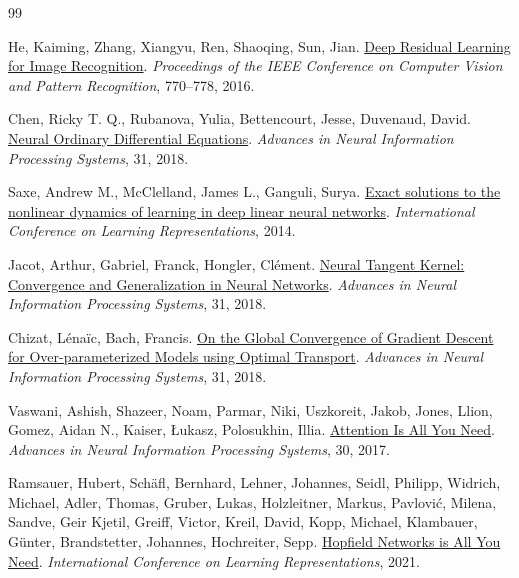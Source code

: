 \documentclass[11pt]{article}
\begin{document}
\begin{thebibliography}{99}

He, Kaiming, Zhang, Xiangyu, Ren, Shaoqing, Sun, Jian.
\newblock \href{https://doi.org/10.1109/CVPR.2016.90}{Deep Residual Learning for Image Recognition}.
\newblock \emph{Proceedings of the IEEE Conference on Computer Vision and Pattern Recognition}, 770--778, 2016.

Chen, Ricky T. Q., Rubanova, Yulia, Bettencourt, Jesse, Duvenaud, David.
\newblock \href{https://arxiv.org/abs/1806.07366}{Neural Ordinary Differential Equations}.
\newblock \emph{Advances in Neural Information Processing Systems}, 31, 2018.

Saxe, Andrew M., McClelland, James L., Ganguli, Surya.
\newblock \href{https://arxiv.org/abs/1312.6120}{Exact solutions to the nonlinear dynamics of learning in deep linear neural networks}.
\newblock \emph{International Conference on Learning Representations}, 2014.

Jacot, Arthur, Gabriel, Franck, Hongler, Cl{\'e}ment.
\newblock \href{https://arxiv.org/abs/1806.07572}{Neural Tangent Kernel: Convergence and Generalization in Neural Networks}.
\newblock \emph{Advances in Neural Information Processing Systems}, 31, 2018.

Chizat, L{\'e}na{\"i}c, Bach, Francis.
\newblock \href{https://arxiv.org/abs/1805.09545}{On the Global Convergence of Gradient Descent for Over-parameterized Models using Optimal Transport}.
\newblock \emph{Advances in Neural Information Processing Systems}, 31, 2018.

Vaswani, Ashish, Shazeer, Noam, Parmar, Niki, Uszkoreit, Jakob, Jones, Llion, Gomez, Aidan N., Kaiser, {\L}ukasz, Polosukhin, Illia.
\newblock \href{https://arxiv.org/abs/1706.03762}{Attention Is All You Need}.
\newblock \emph{Advances in Neural Information Processing Systems}, 30, 2017.

Ramsauer, Hubert, Sch{\"a}fl, Bernhard, Lehner, Johannes, Seidl, Philipp, Widrich, Michael, Adler, Thomas, Gruber, Lukas, Holzleitner, Markus, Pavlovi{\'c}, Milena, Sandve, Geir Kjetil, Greiff, Victor, Kreil, David, Kopp, Michael, Klambauer, G{\"u}nter, Brandstetter, Johannes, Hochreiter, Sepp.
\newblock \href{https://arxiv.org/abs/2008.02217}{Hopfield Networks is All You Need}.
\newblock \emph{International Conference on Learning Representations}, 2021.


\end{thebibliography}
\end{document}
